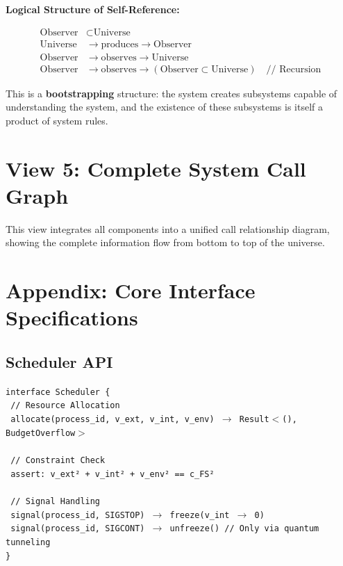 \documentclass[11pt,a4paper,twoside]{book}
\begin{document}
\textbf{Logical Structure of Self-Reference:}

\begin{align*}
\text{Observer} &\subset \text{Universe} \\
\text{Universe} &\to \text{produces} \to \text{Observer} \\
\text{Observer} &\to \text{observes} \to \text{Universe} \\
\text{Observer} &\to \text{observes} \to (\text{Observer} \subset \text{Universe}) \quad \text{// Recursion}
\end{align*}

This is a \textbf{bootstrapping} structure: the system creates subsystems capable of understanding the system, and the existence of these subsystems is itself a product of system rules.

\section{View 5: Complete System Call Graph}

This view integrates all components into a unified call relationship diagram, showing the complete information flow from bottom to top of the universe.

\section{Appendix: Core Interface Specifications}

\subsection{Scheduler API}

\texttt{interface Scheduler \{} \\
\texttt{  // Resource Allocation} \\
\texttt{  allocate(process\_id, v\_ext, v\_int, v\_env) $\to$ Result$<$(), BudgetOverflow$>$} \\
\texttt{  } \\
\texttt{  // Constraint Check} \\
\texttt{  assert: v\_ext² + v\_int² + v\_env² == c\_FS²} \\
\texttt{  } \\
\texttt{  // Signal Handling} \\
\texttt{  signal(process\_id, SIGSTOP) $\to$ freeze(v\_int $\to$ 0)} \\
\texttt{  signal(process\_id, SIGCONT) $\to$ unfreeze()  // Only via quantum tunneling} \\
\texttt{\}}
\end{document}
